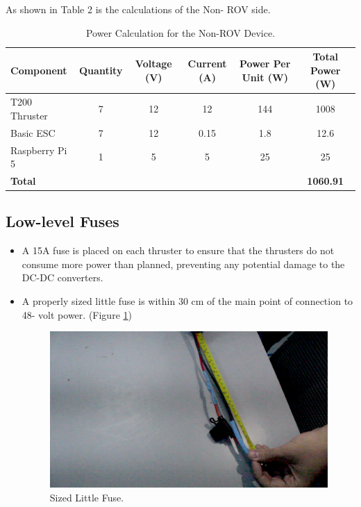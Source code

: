 \documentclass[11pt, twocolumn]{article}
\begin{document}
As shown in Table 2 is the calculations of the Non- ROV side.

\begin{table}[h]
    \centering
    \begin{adjustbox}{max width=\columnwidth}
    \begin{tabular}{@{} l *{5}{c} @{}}
      \toprule
      \textbf{Component} & \textbf{Quantity} & \textbf{Voltage (V)} & \textbf{Current (A)} & \textbf{Power Per Unit (W)} & \textbf{Total Power (W)} \\
      \midrule
      T200 Thruster            & 7 & 12   & 12     & 144    & 1008   \\
      Basic ESC                & 7 & 12   & 0.15   & 1.8    & 12.6   \\
      Raspberry Pi 5           & 1 & 5    & 5      & 25     & 25     \\
      \midrule
     \multicolumn{5}{l}{\textbf{Total}} & \textbf{1060.91} \\
      \bottomrule
    \end{tabular}
    \end{adjustbox}
\caption{Power Calculation for the Non-ROV Device.}
\label{tab:power_calculation}
\end{table}

\subsection{Low-level Fuses}

\begin{itemize}[leftmargin=0pt, itemindent=10pt]
    \setlength{\itemsep}{0pt}

    \item A 15A fuse is placed on each thruster to ensure that the thrusters do not consume more power than planned, preventing any potential damage to the DC-DC converters.
    \item A properly sized little fuse is within 30 cm of the main point of connection to 48- volt power. (Figure \ref{fig:fuse})
    
    \begin{figure}[h!]
        \centering
        \includegraphics[width=0.8\columnwidth]{Images/fuse.png}
        \caption{Sized Little Fuse.}
        \label{fig:fuse}
    \end{figure}
\end{itemize}
\end{document}
